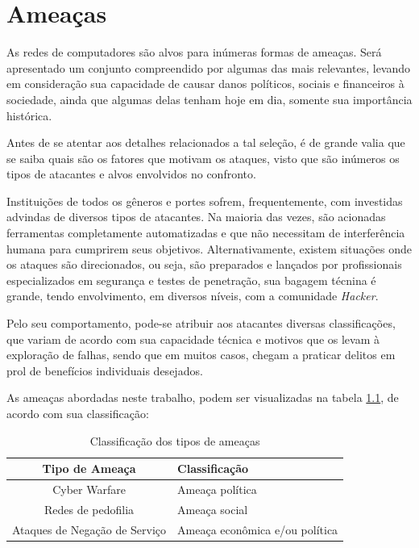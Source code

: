 \chapter{Ameaças}\label{capitulo:ameacas}

As redes de computadores são alvos para inúmeras formas de ameaças. Será apresentado um conjunto compreendido por algumas das mais relevantes, levando em consideração sua capacidade de causar danos políticos, sociais e financeiros à sociedade, ainda que algumas delas tenham hoje em dia, somente sua importância histórica.

Antes de se atentar aos detalhes relacionados a tal seleção, é de grande valia que se saiba quais são os fatores que motivam os ataques, visto que são inúmeros os tipos de atacantes e alvos envolvidos no confronto.

Instituições de todos os gêneros e portes sofrem, frequentemente, com investidas advindas de diversos tipos de atacantes. Na maioria das vezes,  são acionadas ferramentas completamente automatizadas \cite{Botnets} e que não necessitam de interferência humana para cumprirem seus objetivos. Alternativamente, existem situações onde os ataques são direcionados, ou seja, são preparados e lançados por profissionais especializados em segurança e testes de penetração, sua bagagem técnina é grande, tendo envolvimento, em diversos níveis, com a comunidade \textit{Hacker}.

Pelo seu comportamento, pode-se atribuir aos atacantes diversas classificações, que variam de acordo com sua capacidade técnica e motivos que os levam à exploração de falhas, sendo que em muitos casos, chegam a praticar delitos em prol de benefícios individuais desejados.

As ameaças abordadas neste trabalho, podem ser visualizadas na tabela \ref{tabela:ameacas}, de acordo com sua classificação:

\begin{table}[H]
    \begin{center}
        \caption{\label{tabela:ameacas}Classificação dos tipos de ameaças}
        \begin{tabular}{c|p{8cm}}
            \hline
            \hline
                \textbf{Tipo de Ameaça} & \textbf{Classificação}\\
            \hline
                Cyber Warfare & Ameaça política\\
            \hline
                Redes de pedofilia & Ameaça social\\
            \hline
                Ataques de Negação de Serviço & Ameaça econômica e/ou política\\
            \hline
            \hline
        \end{tabular}
    \end{center}
\end{table}



